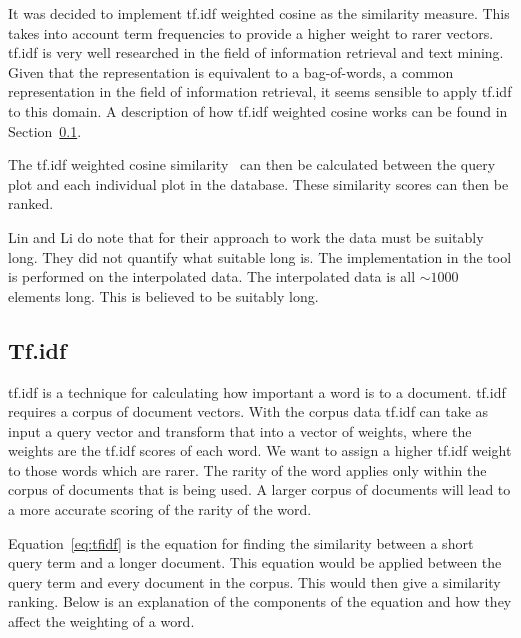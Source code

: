 It was decided to implement \ac{tf.idf} weighted cosine as the similarity measure.  This takes into account term frequencies to provide a higher weight to rarer vectors.  \ac{tf.idf} is very well researched in the field of information retrieval and text mining.  Given that the representation is equivalent to a bag-of-words, a common representation in the field of information retrieval, it seems sensible to apply \ac{tf.idf} to this domain.  A description of how \ac{tf.idf} weighted cosine works can be found in Section~\ref{sec:tfidf}.

The tf.idf weighted cosine similarity~\cite[p.~243]{se_book} can then be calculated between the query plot and each individual plot in the database.  These similarity scores can then be ranked.

Lin and Li do note that for their approach to work the data must be suitably long.  They did not quantify what suitable long is.  The implementation in the tool is performed on the interpolated data.  The interpolated data is all $\sim1000$ elements long.  This is believed to be suitably long.

\subsection{Tf.idf}
\label{sec:tfidf}

\ac{tf.idf} is a technique for calculating how important a word is to a document.  \ac{tf.idf} requires a corpus of document vectors.  With the corpus data \ac{tf.idf} can take as input a query vector and transform that into a vector of weights, where the weights are the \ac{tf.idf} scores of each word.  We want to assign a higher \ac{tf.idf} weight to those words which are rarer.  The rarity of the word applies only within the corpus of documents that is being used.  A larger corpus of documents will lead to a more accurate scoring of the rarity of the word.

Equation~\ref{eq:tfidf} is the equation for finding the similarity between a short query term and a longer document.  This equation would be applied between the query term and every document in the corpus.  This would then give a similarity ranking.  Below is an explanation of the components of the equation and how they affect the weighting of a word.

